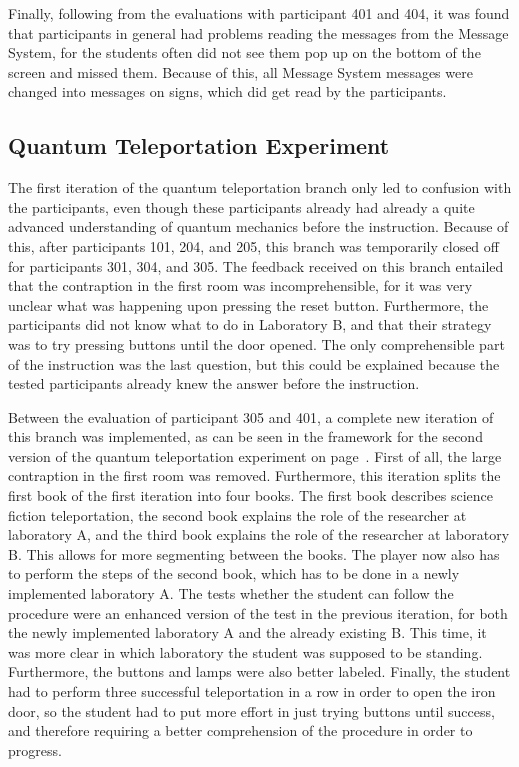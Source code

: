 \documentclass[11pt,twoside]{report} %
\begin{document}
Finally, following from the evaluations with participant 401 and 404, it was found that participants in general had problems reading the messages from the Message System, for the students often did not see them pop up on the bottom of the screen and missed them. Because of this, all Message System messages were changed into messages on signs, which did get read by the participants.

\subsection{Quantum Teleportation Experiment}

The first iteration of the quantum teleportation branch only led to confusion with the participants, even though these participants already had already a quite advanced understanding of quantum mechanics before the instruction. Because of this, after participants 101, 204, and 205, this branch was temporarily closed off for participants 301, 304, and 305. The feedback received on this branch entailed that the contraption in the first room was incomprehensible, for it was very unclear what was happening upon pressing the reset button. Furthermore, the participants did not know what to do in Laboratory B, and that their strategy was to try pressing buttons until the door opened. The only comprehensible part of the instruction was the last question, but this could be explained because the tested participants already knew the answer before the instruction.

Between the evaluation of participant 305 and 401, a complete new iteration of this branch was implemented, as can be seen in the framework for the second version of the quantum teleportation experiment on page~\pageref{app:teleportation2}. First of all, the large contraption in the first room was removed. Furthermore, this iteration splits the first book of the first iteration into four books. The first book describes science fiction teleportation, the second book explains the role of the researcher at laboratory A, and the third book explains the role of the researcher at laboratory B. This allows for more segmenting between the books. The player now also has to perform the steps of the second book, which has to be done in a newly implemented laboratory A. The tests whether the student can follow the procedure were an enhanced version of the test in the previous iteration, for both the newly implemented laboratory A and the already existing B. This time, it was more clear in which laboratory the student was supposed to be standing. Furthermore, the buttons and lamps were also better labeled. Finally, the student had to perform three successful teleportation in a row in order to open the iron door, so the student had to put more effort in just trying buttons until success, and therefore requiring a better comprehension of the procedure in order to progress.
\end{document}
